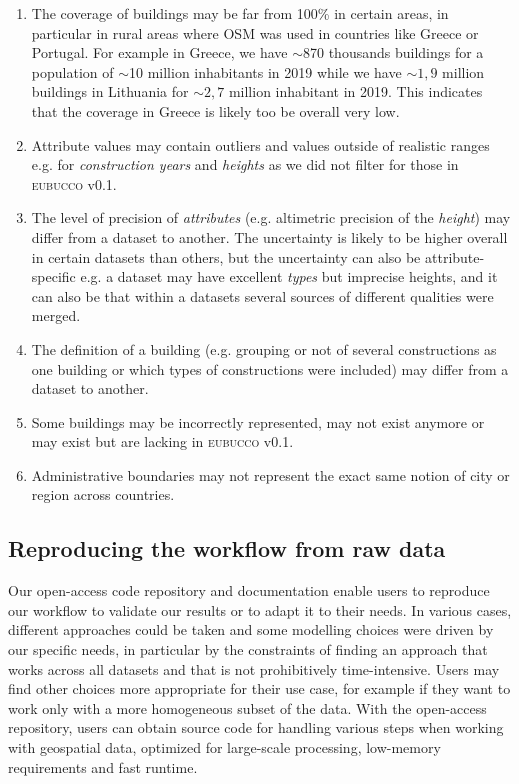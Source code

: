 \documentclass[fleqn,10pt]{wlscirep}
\begin{document}
\begin{enumerate}[topsep=0.2pt]
    \itemsep-0.15em 
    \item The coverage of buildings may be far from 100\% in certain areas, in particular in rural areas where OSM was used in countries like Greece or Portugal. For example in Greece, we have $\sim$870 thousands buildings for a population of $\sim$10 million inhabitants in 2019\cite{un19} while we have $\sim1,9$ million buildings in Lithuania for $\sim 2,7$ million inhabitant in 2019\cite{un19}. This indicates that the coverage in Greece is likely too be overall very low.
    \item Attribute values may contain outliers and values outside of realistic ranges e.g. for \textit{construction years} and \textit{heights} as we did not filter for those in \textsc{eubucco} v0.1.
    \item The level of precision of \textit{attributes} (e.g. altimetric precision of the \textit{height}) may differ from a dataset to another. The uncertainty is likely to be higher overall in certain datasets than others, but the uncertainty can also be attribute-specific e.g. a dataset may have excellent \textit{types} but imprecise heights, and it can also be that within a datasets several sources of different qualities were merged.
    \item The definition of a building (e.g. grouping or not of several constructions as one building or which types of constructions were included) may differ from a dataset to another.
    \item Some buildings may be incorrectly represented, may not exist anymore or may exist but are lacking in \textsc{eubucco} v0.1.
    \item Administrative boundaries may not represent the exact same notion of city or region across countries.  

\end{enumerate}


\subsection*{Reproducing the workflow from raw data}
Our open-access code repository\cite{eubucco-0.1-code2022} and documentation enable users to reproduce our workflow to validate our results or to adapt it to their needs. In various cases, different approaches could be taken and some modelling choices were driven by our specific needs, in particular by the constraints of finding an approach that works across all datasets and that is not prohibitively time-intensive. Users may find other choices more appropriate for their use case, for example if they want to work only with a more homogeneous subset of the data. With the open-access repository, users can obtain source code for handling various steps when working with geospatial data, optimized for large-scale processing, low-memory requirements and fast runtime. 
\end{document}
